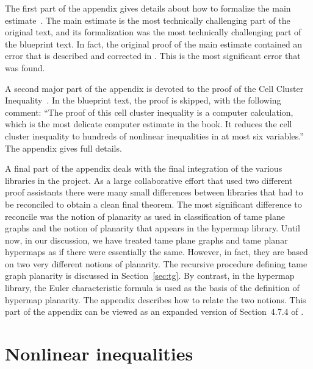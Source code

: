 The first part of the appendix gives details about how to formalize
the main estimate~\cite[Sec~7.4]{DSP}.  The main estimate is the most
technically challenging part of the original text, and its
formalization was the most technically challenging part of the
blueprint text.  In fact, the original proof of the main estimate
contained an error that is described and corrected in \cite{HHMNOZ}.
This is the most significant error that was found.

A second major part of the appendix is devoted to the proof of the
Cell Cluster Inequality~\cite[Thm~6.93]{DSP}.   In the blueprint text, the proof is
skipped, with the following comment: ``The proof of this cell cluster
inequality is a computer calculation, which is the most delicate
computer estimate in the book.  It reduces the cell cluster inequality
to hundreds of nonlinear inequalities in at most six variables.''
The appendix gives full details.

A final part of the appendix deals with the final integration of the
various libraries in the project.  As a large collaborative effort
that used two different proof assistants there were many small
differences between libraries that had to be reconciled to obtain a
clean final theorem.  The most significant difference to reconcile was
the notion of planarity as used in classification of tame plane graphs
and the notion of planarity that appears in the hypermap library.
Until now, in our discussion, we have treated tame plane graphs and
tame planar hypermaps as if there were essentially the same.  However, in
fact, they are based on two very different notions of planarity.  The
recursive procedure defining tame graph planarity is discussed in
Section~\ref{sec:tg}.  By contrast, in the hypermap library, the Euler
characteristic formula is used as the basis of the definition of
hypermap planarity.  The appendix describes how to relate the two
notions.  This part of the appendix can be viewed as an expanded
version of Section~4.7.4 of \cite{DSP}.


\section{Nonlinear inequalities}\label{sec:ni}

